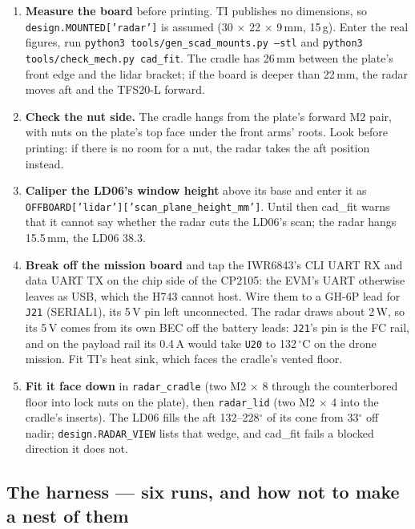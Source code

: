 \documentclass[11pt,a4paper]{article}
\newcommand{\file}[1]{\texttt{\small #1}}
\newcommand{\cmd}[1]{\texttt{\small #1}}
\newcommand{\degC}{$^\circ$C}
\begin{document}
\begin{enumerate}
\item \textbf{Measure the board} before printing. TI publishes no dimensions, so
\file{design.MOUNTED['radar']} is assumed (30 $\times$ 22 $\times$ 9\,mm, 15\,g). Enter the real
figures, run \cmd{python3 tools/gen\_scad\_mounts.py --stl} and
\cmd{python3 tools/check\_mech.py cad\_fit}. The cradle has 26\,mm between the plate's front edge
and the lidar bracket; if the board is deeper than 22\,mm, the radar moves aft and the TFS20-L
forward.
\item \textbf{Check the nut side.} The cradle hangs from the plate's forward M2 pair, with nuts
on the plate's top face under the front arms' roots. Look before printing: if there is no room
for a nut, the radar takes the aft position instead.
\item \textbf{Caliper the LD06's window height} above its base and enter it as
\file{OFFBOARD['lidar']['scan\_plane\_height\_mm']}. Until then cad\_fit warns that it cannot
say whether the radar cuts the LD06's scan; the radar hangs 15.5\,mm, the LD06 38.3.
\item \textbf{Break off the mission board} and tap the IWR6843's CLI UART RX and data UART TX on
the chip side of the CP2105: the EVM's UART otherwise leaves as USB, which the H743 cannot
host. Wire them to a GH-6P lead for \file{J21} (SERIAL1), its 5\,V pin left unconnected. The
radar draws about 2\,W, so its 5\,V comes from its own BEC off the battery leads: \file{J21}'s
pin is the FC rail, and on the payload rail its 0.4\,A would take \file{U20} to 132\,\degC{} on
the drone mission. Fit TI's heat sink, which faces the cradle's vented floor.
\item \textbf{Fit it face down} in \file{radar\_cradle} (two M2 $\times$ 8 through the counterbored
floor into lock nuts on the plate), then \file{radar\_lid} (two M2 $\times$ 4 into the cradle's
inserts). The LD06 fills the aft 132--228$^\circ$ of its cone from 33$^\circ$ off nadir;
\file{design.RADAR\_VIEW} lists that wedge, and cad\_fit fails a blocked direction it does not.
\end{enumerate}

\subsection{The harness --- six runs, and how not to make a nest of them}
\end{document}
